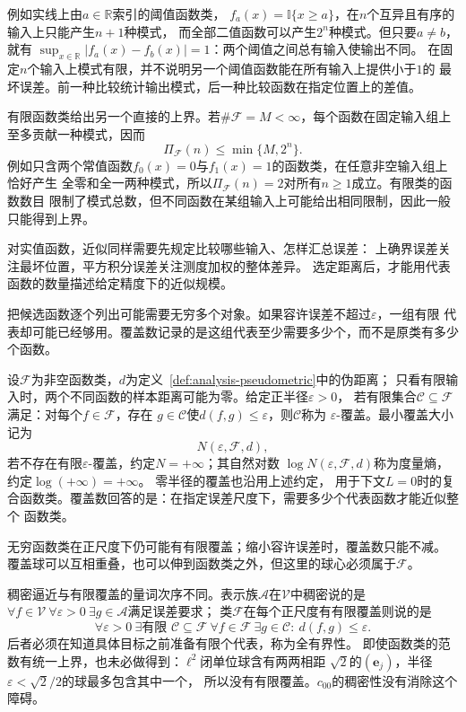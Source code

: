 例如实线上由$a\in\mathbb R$索引的阈值函数类，
$f_a(x)=\mathbb{I}\{x\geq a\}$，在$n$个互异且有序的输入上只能产生$n+1$种模式，
而全部二值函数可以产生$2^n$种模式。但只要$a\neq b$，就有
$\sup_{x\in\mathbb R}|f_a(x)-f_b(x)|=1$：两个阈值之间总有输入使输出不同。
在固定$n$个输入上模式有限，并不说明另一个阈值函数能在所有输入上提供小于$1$的
最坏误差。前一种比较统计输出模式，后一种比较函数在指定位置上的差值。

有限函数类给出另一个直接的上界。若$\#\mathcal{F}=M<\infty$，每个函数在固定输入组上
至多贡献一种模式，因而
\[
  \Pi_{\mathcal{F}}(n)\leq\min\{M,2^n\}.
\]
例如只含两个常值函数$f_0(x)=0$与$f_1(x)=1$的函数类，在任意非空输入组上恰好产生
全零和全一两种模式，所以$\Pi_{\mathcal{F}}(n)=2$对所有$n\geq1$成立。有限类的函数数目
限制了模式总数，但不同函数在某组输入上可能给出相同限制，因此一般只能得到上界。

对实值函数，近似同样需要先规定比较哪些输入、怎样汇总误差：
上确界误差关注最坏位置，平方积分误差关注测度加权的整体差异。
选定距离后，才能用代表函数的数量描述给定精度下的近似规模。

把候选函数逐个列出可能需要无穷多个对象。如果容许误差不超过$\varepsilon$，一组有限
代表却可能已经够用。覆盖数记录的是这组代表至少需要多少个，而不是原类有多少个函数。
\begin{definition}[函数类的覆盖数与度量熵]
\label{def:functional-covering-number}
设$\mathcal F$为非空函数类，$d$为定义~\ref{def:analysis-pseudometric}中的伪距离；
只看有限输入时，两个不同函数的样本距离可能为零。给定正半径$\varepsilon>0$，
若有限集合$\mathcal{C}\subseteq\mathcal{F}$满足：对每个$f\in\mathcal{F}$，存在
$g\in\mathcal{C}$使$d(f,g)\leq\varepsilon$，则$\mathcal{C}$称为
$\varepsilon$-覆盖。最小覆盖大小记为
\[
  N(\varepsilon,\mathcal{F},d),
\]
若不存在有限$\varepsilon$-覆盖，约定$N=+\infty$；其自然对数
$\log N(\varepsilon,\mathcal F,d)$称为度量熵，约定$\log(+\infty)=+\infty$。
零半径的覆盖也沿用上述约定，
用于下文$L=0$时的复合函数类。覆盖数回答的是：在指定误差尺度下，需要多少个代表函数才能近似整个
函数类。
\end{definition}
无穷函数类在正尺度下仍可能有有限覆盖；缩小容许误差时，覆盖数只能不减。
覆盖球可以互相重叠，也可以伸到函数类之外，但这里的球心必须属于$\mathcal F$。

稠密逼近与有限覆盖的量词次序不同。表示族$\mathcal A$在$\mathcal V$中稠密说的是
$\forall f\in\mathcal V\ \forall\varepsilon>0\ \exists g\in\mathcal A$满足误差要求；
类$\mathcal F$在每个正尺度有有限覆盖则说的是
\[
 \forall\varepsilon>0\ \exists\text{有限 }\mathcal C\subseteq\mathcal F\
 \forall f\in\mathcal F\ \exists g\in\mathcal C:\ d(f,g)\leq\varepsilon.
\]
后者必须在知道具体目标之前准备有限个代表，称为全有界性。
即使函数类的范数有统一上界，也未必做得到：$\ell^2$闭单位球含有两两相距
$\sqrt2$的$(\bm e_j)$，半径$\varepsilon<\sqrt2/2$的球最多包含其中一个，
所以没有有限覆盖。$c_{00}$的稠密性没有消除这个障碍。

